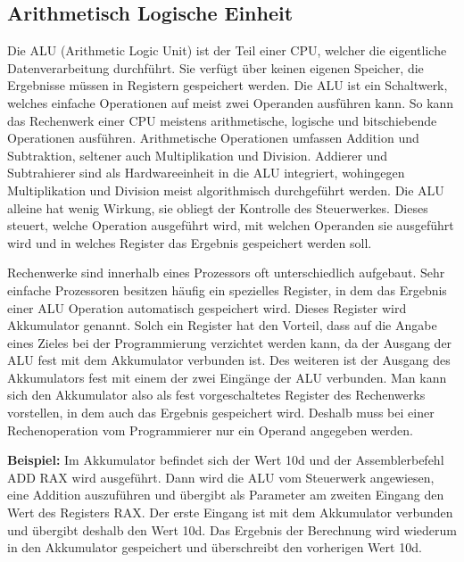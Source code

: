\documentclass[a4paper,12pt]{article}
\begin{document}
\subsection{Arithmetisch Logische Einheit} \label{subsec:alu}
Die ALU (Arithmetic Logic Unit) ist der Teil einer CPU, welcher die eigentliche Datenverarbeitung durchführt. Sie verfügt über keinen eigenen Speicher, die Ergebnisse müssen in Registern gespeichert werden. Die ALU ist ein Schaltwerk, welches einfache Operationen auf meist zwei Operanden ausführen kann. So kann das Rechenwerk einer CPU meistens arithmetische, logische und bitschiebende Operationen ausführen. Arithmetische Operationen umfassen Addition und Subtraktion, seltener auch Multiplikation und Division. Addierer und Subtrahierer sind als Hardwareeinheit in die ALU integriert, wohingegen Multiplikation und Division meist algorithmisch durchgeführt werden. Die ALU alleine hat wenig Wirkung, sie obliegt der Kontrolle des Steuerwerkes. Dieses steuert, welche Operation ausgeführt wird, mit welchen Operanden sie ausgeführt wird und in welches Register das Ergebnis gespeichert werden soll.

\par \bigskip
\noindent Rechenwerke sind innerhalb eines Prozessors oft unterschiedlich aufgebaut. 
Sehr einfache Prozessoren besitzen häufig ein spezielles Register, in dem das Ergebnis einer ALU Operation automatisch gespeichert wird. Dieses Register wird Akkumulator genannt. Solch ein Register hat den Vorteil, dass auf die Angabe eines Zieles bei der Programmierung verzichtet werden kann, da der Ausgang der ALU fest mit dem Akkumulator verbunden ist. Des weiteren ist der Ausgang des Akkumulators fest mit einem der zwei Eingänge der ALU verbunden. Man kann sich den Akkumulator also als fest vorgeschaltetes Register des Rechenwerks vorstellen, in dem auch das Ergebnis gespeichert wird. Deshalb muss bei einer Rechenoperation vom Programmierer nur ein Operand angegeben werden. 

\par\bigskip\noindent \textbf{Beispiel:} Im Akkumulator befindet sich der Wert 10d  und der Assemblerbefehl ADD RAX wird ausgeführt. Dann wird die ALU vom Steuerwerk angewiesen, eine Addition auszuführen und übergibt als Parameter am zweiten Eingang den Wert des Registers RAX. Der erste Eingang ist mit dem Akkumulator verbunden und übergibt deshalb den Wert 10d. Das Ergebnis der Berechnung wird wiederum in den Akkumulator gespeichert und überschreibt den vorherigen Wert 10d.  
\end{document}
